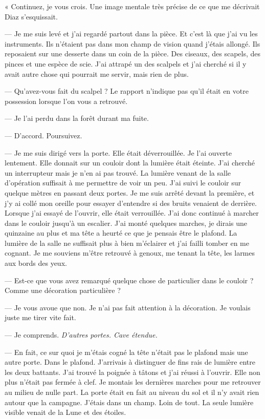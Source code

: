 « Continuez, je vous crois. Une image mentale très précise de ce que me décrivait Diaz s'esquissait.

— Je me suis levé et j'ai regardé partout dans la pièce. Et c'est là que j'ai vu les instruments. Ils n'étaient pas
dans mon champ de vision quand j'étais allongé. Ils reposaient sur une desserte dans un coin de la pièce. Des ciseaux,
des scapels, des pinces et une espèce de scie. J'ai attrapé un des scalpels et j'ai cherché si il y avait autre chose
qui pourrait me servir, mais rien de plus.

— Qu'avez-vous fait du scalpel ? Le rapport n'indique pas qu'il était en votre possession lorsque l'on vous a retrouvé.

— Je l'ai perdu dans la forêt durant ma fuite.

— D'accord. Poursuivez.

— Je me suis dirigé vers la porte. Elle était déverrouillée. Je l'ai ouverte lentement. Elle donnait sur un couloir
dont la lumière était éteinte. J'ai cherché un interrupteur mais je n'en ai pas trouvé. La lumière venant de la
salle d'opération suffisait à me permettre de voir un peu. J'ai suivi le couloir sur quelque mètres en passant deux
portes. Je me suis arrêté devant la première, et j'y ai collé mon oreille pour essayer d'entendre si des bruits venaient
de derrière. Lorsque j'ai essayé de l'ouvrir, elle était verrouillée. J'ai donc continué à marcher dans le couloir
jusqu'à un escalier. J'ai monté quelques marches, je dirais une quinzaine au plus et ma tête a heurté ce que je pensais
être le plafond. La lumière de la salle ne suffisait plus à bien m'éclairer et j'ai failli tomber en me cognant. Je me
souviens m'être retrouvé à genoux, me tenant la tête, les larmes aux bords des yeux.

— Est-ce que vous avez remarqué quelque chose de particulier dans le couloir ? Comme une décoration particulière ?

— Je vous avoue que non. Je n'ai pas fait attention à la décoration. Je voulais juste me tirer vite fait.

— Je comprends. \emph{D'autres portes. Cave étendue.}

— En fait, ce sur quoi je m'étais cogné la tête n'était pas le plafond mais une autre porte. Dans le plafond. J'arrivais
à distinguer de fins rais de lumière entre les deux battants. J'ai trouvé la poignée à tâtons et j'ai réussi à l'ouvrir.
Elle non plus n'était pas fermée à clef. Je montais les dernières marches pour me retrouver au milieu de nulle part. La
porte était en fait au niveau du sol et il n'y avait rien autour que la campagne. J'étais dans un champ. Loin de tout.
La seule lumière visible venait de la Lune et des étoiles.

